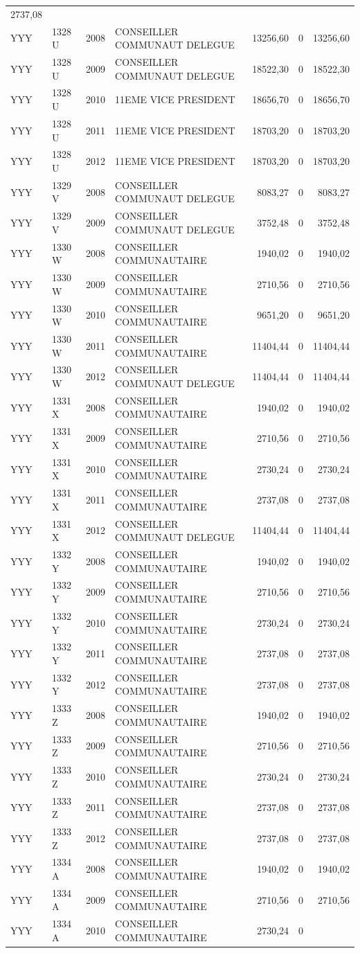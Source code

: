 \begin{longtable}[]{@{}llrlrrr@{}}
2737,08\tabularnewline
YYY & 1328 U & 2008 & CONSEILLER COMMUNAUT DELEGUE & 13256,60 & 0 &
13256,60\tabularnewline
YYY & 1328 U & 2009 & CONSEILLER COMMUNAUT DELEGUE & 18522,30 & 0 &
18522,30\tabularnewline
YYY & 1328 U & 2010 & 11EME VICE PRESIDENT & 18656,70 & 0 &
18656,70\tabularnewline
YYY & 1328 U & 2011 & 11EME VICE PRESIDENT & 18703,20 & 0 &
18703,20\tabularnewline
YYY & 1328 U & 2012 & 11EME VICE PRESIDENT & 18703,20 & 0 &
18703,20\tabularnewline
YYY & 1329 V & 2008 & CONSEILLER COMMUNAUT DELEGUE & 8083,27 & 0 &
8083,27\tabularnewline
YYY & 1329 V & 2009 & CONSEILLER COMMUNAUT DELEGUE & 3752,48 & 0 &
3752,48\tabularnewline
YYY & 1330 W & 2008 & CONSEILLER COMMUNAUTAIRE & 1940,02 & 0 &
1940,02\tabularnewline
YYY & 1330 W & 2009 & CONSEILLER COMMUNAUTAIRE & 2710,56 & 0 &
2710,56\tabularnewline
YYY & 1330 W & 2010 & CONSEILLER COMMUNAUTAIRE & 9651,20 & 0 &
9651,20\tabularnewline
YYY & 1330 W & 2011 & CONSEILLER COMMUNAUTAIRE & 11404,44 & 0 &
11404,44\tabularnewline
YYY & 1330 W & 2012 & CONSEILLER COMMUNAUT DELEGUE & 11404,44 & 0 &
11404,44\tabularnewline
YYY & 1331 X & 2008 & CONSEILLER COMMUNAUTAIRE & 1940,02 & 0 &
1940,02\tabularnewline
YYY & 1331 X & 2009 & CONSEILLER COMMUNAUTAIRE & 2710,56 & 0 &
2710,56\tabularnewline
YYY & 1331 X & 2010 & CONSEILLER COMMUNAUTAIRE & 2730,24 & 0 &
2730,24\tabularnewline
YYY & 1331 X & 2011 & CONSEILLER COMMUNAUTAIRE & 2737,08 & 0 &
2737,08\tabularnewline
YYY & 1331 X & 2012 & CONSEILLER COMMUNAUT DELEGUE & 11404,44 & 0 &
11404,44\tabularnewline
YYY & 1332 Y & 2008 & CONSEILLER COMMUNAUTAIRE & 1940,02 & 0 &
1940,02\tabularnewline
YYY & 1332 Y & 2009 & CONSEILLER COMMUNAUTAIRE & 2710,56 & 0 &
2710,56\tabularnewline
YYY & 1332 Y & 2010 & CONSEILLER COMMUNAUTAIRE & 2730,24 & 0 &
2730,24\tabularnewline
YYY & 1332 Y & 2011 & CONSEILLER COMMUNAUTAIRE & 2737,08 & 0 &
2737,08\tabularnewline
YYY & 1332 Y & 2012 & CONSEILLER COMMUNAUTAIRE & 2737,08 & 0 &
2737,08\tabularnewline
YYY & 1333 Z & 2008 & CONSEILLER COMMUNAUTAIRE & 1940,02 & 0 &
1940,02\tabularnewline
YYY & 1333 Z & 2009 & CONSEILLER COMMUNAUTAIRE & 2710,56 & 0 &
2710,56\tabularnewline
YYY & 1333 Z & 2010 & CONSEILLER COMMUNAUTAIRE & 2730,24 & 0 &
2730,24\tabularnewline
YYY & 1333 Z & 2011 & CONSEILLER COMMUNAUTAIRE & 2737,08 & 0 &
2737,08\tabularnewline
YYY & 1333 Z & 2012 & CONSEILLER COMMUNAUTAIRE & 2737,08 & 0 &
2737,08\tabularnewline
YYY & 1334 A & 2008 & CONSEILLER COMMUNAUTAIRE & 1940,02 & 0 &
1940,02\tabularnewline
YYY & 1334 A & 2009 & CONSEILLER COMMUNAUTAIRE & 2710,56 & 0 &
2710,56\tabularnewline
YYY & 1334 A & 2010 & CONSEILLER COMMUNAUTAIRE & 2730,24 & 0 &

\end{longtable}
